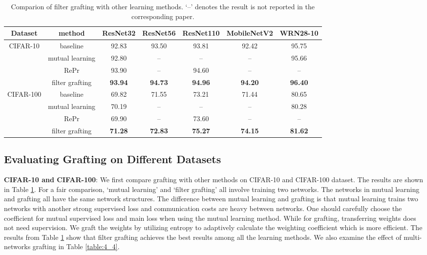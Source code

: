 \documentclass{article}
\begin{document}
\begin{table}[!h]
	\begin{center}
		\begin{tabular}{c|c|c|c|c|c|c} 
			\hline 
			Dataset&method&ResNet32&ResNet56&ResNet110&MobileNetV2&WRN28-10\\
			\hline 
			\multirow{4}{*}{CIFAR-10}
			&baseline&92.83&93.50&93.81&92.42&95.75\\
			&mutual learning \cite{zhang2018deep}&92.80&--&--&--&95.66\\
			&RePr \cite{prakash2019repr}&93.90&--&94.60&--&--\\
			&filter grafting&\textbf{93.94}&\textbf{94.73}&\textbf{94.96}&\textbf{94.20}&\textbf{96.40}\\
			\hline 
			\multirow{4}{*}{CIFAR-100}
			&baseline&69.82&71.55&73.21&71.44&80.65\\
			&mutual learning \cite{zhang2018deep}&70.19&--&--&--&80.28\\
			&RePr \cite{prakash2019repr}&69.90&--&73.60&--&--\\
			&filter grafting&\textbf{71.28}&\textbf{72.83}&\textbf{75.27}&\textbf{74.15}&\textbf{81.62}\\
			\hline 
		\end{tabular}
	\end{center}
	\caption{Comparion of filter grafting with other learning methods. `--' denotes the result is not reported in the corresponding paper.}
	\label{table:4_3}
\end{table}


\subsection{Evaluating Grafting on Different Datasets}\label{sec_4_2}

\textbf{CIFAR-10 and CIFAR-100}: We first compare grafting with other methods on CIFAR-10 and CIFAR-100 dataset. The results are shown in Table \ref{table:4_3}. For a fair comparison, `mutual learning' and `filter grafting' all involve training two networks. The networks in mutual learning and grafting all have the same network structures. The difference between mutual learning and grafting is that mutual learning trains two networks with another strong supervised loss and communication costs are heavy between networks. One should carefully choose the coefficient for mutual supervised loss and main loss when using the mutual learning method. While for grafting, transferring weights does not need supervision. We graft the weights by utilizing entropy to adaptively calculate the weighting coefficient which is more efficient. The results from Table \ref{table:4_3} show that filter grafting achieves the best results among all the learning methods. We also examine the effect of multi-networks grafting in Table \ref{table:4_4}.
\end{document}
